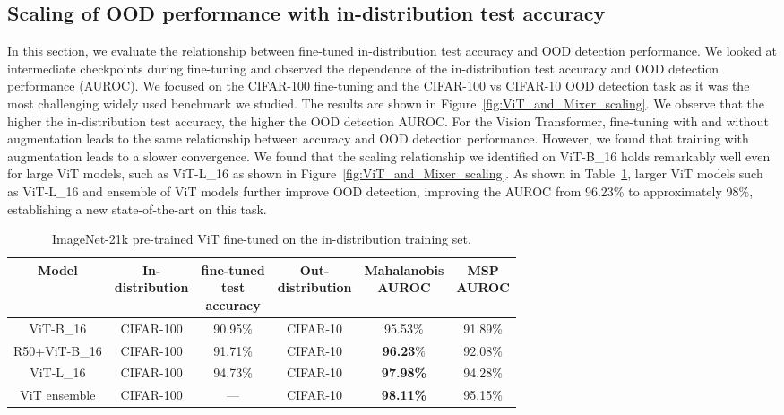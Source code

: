 \documentclass{article}
\newcommand{\test}{\mathcal{D_{\mathrm{test}}}}
\begin{document}
\subsection{Scaling of OOD performance with in-distribution test accuracy}\label{sec:accuracy-vs-ood}
In this section, we evaluate the relationship between fine-tuned in-distribution test accuracy and OOD detection performance. 
We looked at intermediate checkpoints during fine-tuning and observed the dependence of the in-distribution test accuracy and OOD detection performance (AUROC). We focused on the CIFAR-100 fine-tuning and the CIFAR-100 vs CIFAR-10 OOD detection task as it was the most challenging widely used benchmark we studied. The results 
are shown in Figure~\ref{fig:ViT_and_Mixer_scaling}. We observe that the higher the in-distribution test accuracy, the higher the OOD detection AUROC. For the Vision Transformer, fine-tuning with and without augmentation leads to the same relationship between accuracy and OOD detection performance. However, we found that training with augmentation leads to a slower convergence. We found that the scaling relationship we identified on ViT-B\_16 holds remarkably well even for large ViT models, such as ViT-L\_16 as shown in Figure~\ref{fig:ViT_and_Mixer_scaling}. As shown in Table~\ref{tab:ViT_fine-tuned:additional}, larger ViT models such as ViT-L\_16 and ensemble of ViT models further improve OOD detection, improving the AUROC from 96.23\% to approximately 98\%, establishing a new state-of-the-art on this task.   


\begin{table}[h]
\begin{center}	
\vspace{-1em}
\caption{ImageNet-21k pre-trained ViT  fine-tuned on the in-distribution training set. }
\begin{tabular}{ c|c|c|c|c|c } 
	Model & \makecell{In-\\distribution} & \makecell{fine-tuned\\test\\accuracy} & \makecell{Out-\\distribution} & \makecell{Mahalanobis\\AUROC} & \makecell{MSP\\AUROC} \\
	\hline
ViT-B\_16 & CIFAR-100 & 90.95\% & CIFAR-10 & 95.53\% & 91.89\% \\
	R50+ViT-B\_16 & CIFAR-100 & 91.71\% & CIFAR-10 & \textbf{96.23}\% & 92.08\% \\
ViT-L\_16 & CIFAR-100 & 94.73\% & CIFAR-10 & \textbf{97.98\%} & 94.28\% \\
	ViT ensemble & CIFAR-100 & --- & CIFAR-10 & \textbf{98.11\%} & 95.15\% \\
\bottomrule
\end{tabular}
\vspace{-1em}
\label{tab:ViT_fine-tuned:additional}
\end{center}
\end{table}
\end{document}
